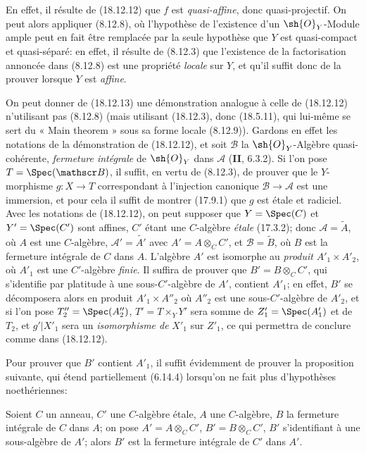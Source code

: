 En effet, il résulte de (18.12.12) que $f$ est \emph{quasi-affine}, donc quasi-projectif. On peut alors appliquer (8.12.8), où l'hypothèse de l'existence d'un $\sh{O}_Y$-Module ample peut en fait être remplacée par la seule hypothèse que $Y$ est quasi-compact et quasi-séparé: en effet, il résulte de (8.12.3) que l'existence de la factorisation annoncée dans (8.12.8) est une propriété \emph{locale} sur $Y$, et qu'il suffit donc de la prouver lorsque $Y$ est \emph{affine}.

\begin{remark}[18.12.14]
\label{IV.18.12.14}
On peut donner de (18.12.13) une démonstration analogue à celle de (18.12.12) n'utilisant pas (8.12.8) (mais utilisant (18.12.3), donc (18.5.11), qui lui-même se sert du « Main theorem » sous sa forme locale (8.12.9)). Gardons en effet les notations de la démonstration de (18.12.12), et soit $\mathscr B$ la $\sh{O}_Y$-Algèbre quasi-cohérente, \emph{fermeture intégrale} de $\sh{O}_Y$ dans $\mathscr A$ (\textbf{II}, 6.3.2). Si l'on pose $T=\Spec(\mathscr B)$, il suffit, en vertu de (8.12.3), de prouver que le $Y$-morphisme $g:X\to T$ correspondant à l'injection canonique $\mathscr B\to\mathscr A$ est une immersion, et pour cela il suffit de montrer (17.9.1) que $g$ est étale et radiciel. Avec les notations de (18.12.12), on peut supposer que $Y=\Spec(C)$ et $Y'=\Spec(C')$ sont affines, $C'$ étant une $C$-algèbre \emph{étale} (17.3.2); donc $\mathscr A=\widetilde A$, où $A$ est une $C$-algèbre, $\mathscr A'=\widetilde{A'}$ avec $A'=A\otimes_C C'$, et $\mathscr B=\widetilde B$, où $B$ est la fermeture intégrale de $C$ dans $A$. L'algèbre $A'$ est isomorphe au \emph{produit} $A'_1\times A'_2$, où $A'_1$ est une $C'$-algèbre \emph{finie}. Il suffira de prouver que $B'=B\otimes_C C'$, qui
s'identifie par platitude à une sous-$C'$-algèbre de $A'$, contient $A'_1$; en effet, $B'$ se décomposera alors en produit $A'_1\times A''_2$ où $A''_2$ est une sous-$C'$-algèbre de $A'_2$, et si l'on pose $T''_2=\Spec(A''_2)$, $T'=T\times_Y Y'$ sera somme de $Z'_1=\Spec(A'_1)$ et de $T_2$, et $g'|X'_1$ sera un \emph{isomorphisme de} $X'_1$ sur $Z'_1$, ce qui permettra de conclure comme dans (18.12.12).

Pour prouver que $B'$ contient $A'_1$, il suffit évidemment de prouver la proposition suivante, qui étend partiellement (6.14.4) lorsqu'on ne fait plus d'hypothèses noethériennes:
\end{remark}

\begin{proposition}[18.12.15]
\label{IV.18.12.15}
Soient $C$ un anneau, $C'$ une $C$-algèbre \textup{étale}, $A$ une $C$-algèbre, $B$ la fermeture intégrale de $C$ dans $A$; on pose $A'=A\otimes_C C'$, $B'=B\otimes_C C'$, $B'$ s'identifiant à une sous-algèbre de $A'$; alors $B'$ est la fermeture intégrale de $C'$ dans $A'$.
\end{proposition}

